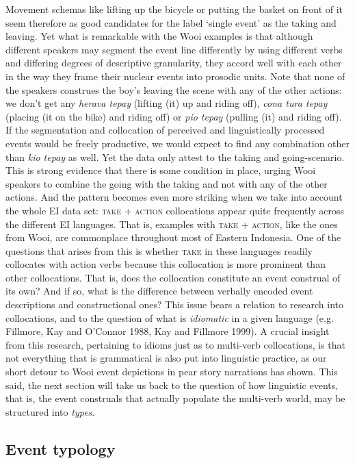 Movement schemas like lifting up the bicycle or putting the basket on front of it seem therefore as good candidates for the label `single event' as the taking and leaving. Yet what is remarkable with the Wooi examples is that although different speakers may segment the event line differently by using different verbs and differing degrees of descriptive granularity, they accord well with each other in the way they frame their nuclear events into prosodic units. Note that none of the speakers construes the boy's leaving the scene with any of the other actions: we don't get any \textit{herava tepay} (lifting (it) up and riding off), \textit{cona tura tepay} (placing (it on the bike) and riding off) or \textit{pio tepay} (pulling (it) and riding off). If the segmentation and collocation of perceived and linguistically processed events would be freely productive, we would expect to find any combination other than \textit{kio tepay} as well. Yet the data only attest to the taking and going-scenario. This is strong evidence that there is some condition in place, urging Wooi speakers to combine the going with the taking and not with any of the other actions. And the pattern becomes even more striking when we take into account the whole EI data set: \textsc{take} + \textsc{action} collocations appear quite frequently across the different EI languages. That is, examples with \textsc{take} + \textsc{action}, like the ones from Wooi, are commonplace throughout most of Eastern Indonesia. One of the questions that arises from this is whether \textsc{take} in these languages readily collocates with action verbs because this collocation is more prominent than other collocations. That is, does the collocation constitute an event construal of its own? And if so, what is the difference between verbally encoded event descriptions and constructional ones? This issue  bears a relation to research into collocations, and to the question of what is \emph{idiomatic} in a given language (e.g. Fillmore, Kay and O'Connor 1988, Kay and Fillmore 1999). A crucial insight from this research, pertaining to idioms just as to multi-verb collocations, is that not everything that is grammatical is also put into linguistic practice, as our short detour to Wooi event depictions in pear story narrations has shown. This said, the next section will take us back to the question of how linguistic events, that is, the event construals that actually populate the multi-verb world, may be structured into \emph{types}.

\subsection{Event typology}

